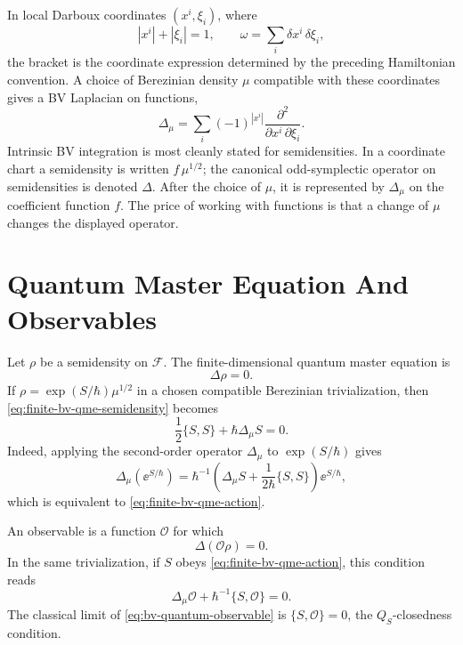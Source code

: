 In local Darboux coordinates \((x^i,\xi_i)\), where
\[
  |x^i|+|\xi_i|=1,\qquad
  \omega=\sum_i \delta x^i\,\delta\xi_i,
\]
the bracket is the coordinate expression determined by the preceding
Hamiltonian convention.  A choice of Berezinian density \(\mu\) compatible
with these coordinates gives a BV Laplacian on functions,
\begin{equation}
  \Delta_\mu
  =
  \sum_i(-1)^{|x^i|}
  \frac{\partial^2}{\partial x^i\,\partial\xi_i}.
  \label{eq:bv-laplacian-darboux}
\end{equation}
Intrinsic BV integration is most cleanly stated for semidensities.  In a
coordinate chart a semidensity is written \(f\,\mu^{1/2}\); the canonical
odd-symplectic operator on semidensities is denoted \(\Delta\).  After the
choice of \(\mu\), it is represented by \(\Delta_\mu\) on the coefficient
function \(f\).  The price of working with functions is that a change of
\(\mu\) changes the displayed operator.

\section{Quantum Master Equation And Observables}

Let \(\rho\) be a semidensity on \(\mathcal F\).  The finite-dimensional
quantum master equation is
\begin{equation}
  \Delta\rho=0 .
  \label{eq:finite-bv-qme-semidensity}
\end{equation}
If \(\rho=\exp(S/\hbar)\mu^{1/2}\) in a chosen compatible Berezinian
trivialization, then \eqref{eq:finite-bv-qme-semidensity} becomes
\begin{equation}
  \frac12\{S,S\}+\hbar\Delta_\mu S=0 .
  \label{eq:finite-bv-qme-action}
\end{equation}
Indeed, applying the second-order operator \(\Delta_\mu\) to
\(\exp(S/\hbar)\) gives
\[
  \Delta_\mu\!\left(\ee^{S/\hbar}\right)
  =
  \hbar^{-1}
  \left(\Delta_\mu S+\frac{1}{2\hbar}\{S,S\}\right)\ee^{S/\hbar},
\]
which is equivalent to \eqref{eq:finite-bv-qme-action}.

An observable is a function \(\mathcal O\) for which
\[
  \Delta(\mathcal O\rho)=0 .
\]
In the same trivialization, if \(S\) obeys
\eqref{eq:finite-bv-qme-action}, this condition reads
\begin{equation}
  \Delta_\mu\mathcal O+\hbar^{-1}\{S,\mathcal O\}=0 .
  \label{eq:bv-quantum-observable}
\end{equation}
The classical limit of \eqref{eq:bv-quantum-observable} is
\(\{S,\mathcal O\}=0\), the \(Q_S\)-closedness condition.

